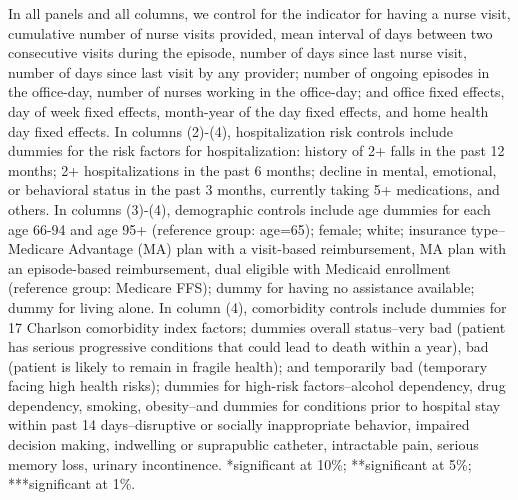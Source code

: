 \documentclass[final,12pt, notitlepage]{article}
\begin{document}
\begin{singlespace}
\begin{table}[H]
\begin{threeparttable}
\begin{tablenotes}
	In all panels and all columns, we control for the indicator for having a nurse visit, cumulative number of nurse visits provided, mean interval of days between two consecutive visits during the episode, number of days since last nurse visit, number of days since last visit by any provider; number of ongoing episodes in the office-day, number of nurses working in the office-day; and office fixed effects, day of week fixed effects, month-year of the day fixed effects, and home health day fixed effects.
	In columns (2)-(4), hospitalization risk controls include dummies for the risk factors for hospitalization: history of 2+ falls in the past 12 months; 2+ hospitalizations in the past 6 months; decline in mental, emotional, or behavioral status in the past 3 months, currently taking 5+ medications, and others.
	In columns (3)-(4), demographic controls include age dummies for each age 66-94 and age 95+ (reference group: age=65); female; white; insurance type--Medicare Advantage (MA) plan with a visit-based reimbursement, MA plan with an episode-based reimbursement, dual eligible with Medicaid enrollment (reference group: Medicare FFS); dummy for having no assistance available; dummy for living alone.
	In column (4), comorbidity controls include dummies for 17 Charlson comorbidity index factors; dummies overall status--very bad (patient has serious progressive conditions that could lead to death within a year), bad (patient is likely to remain in fragile health); and temporarily bad (temporary facing high health risks); dummies for high-risk factors--alcohol dependency, drug dependency, smoking, obesity--and dummies for conditions prior to hospital stay within past 14 days--disruptive or socially inappropriate behavior, impaired decision making, indwelling or suprapublic catheter, intractable pain, serious memory loss, urinary incontinence.
	 *significant at 10\%; **significant at 5\%; ***significant at 1\%.
	\end{tablenotes}
\end{threeparttable}
\end{table}




\end{singlespace}
\end{document}
